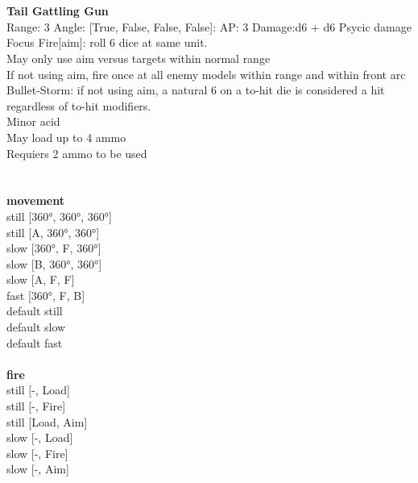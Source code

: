 \ \\

\ \\
{\bf Tail Gattling Gun } \\



Range: 3  Angle: [True, False, False, False]: AP: 3 Damage:d6 + d6 Psycic damage \\
Focus Fire[aim]: roll 6 dice at same unit.\\ 
May only use aim versus targets within normal range\\ 
If not using aim, fire once at all enemy models within range and within front arc\\ 
Bullet-Storm: if not using aim, a natural 6 on a to-hit die is considered a hit regardless of to-hit modifiers.\\ 
Minor acid\\ 
May load up to 4 ammo\\ 
Requiers 2 ammo to be used\\ 




 
\ \\



\ \\ {\bf movement } \\
still [360°, 360°, 360°] \\
still [A, 360°, 360°] \\
slow [360°, F, 360°] \\
slow [B, 360°, 360°] \\
slow [A, F, F] \\
fast [360°, F, B] \\
default still \\
default slow \\
default fast \\
\ \\ {\bf fire } \\
still [-, Load] \\
still [-, Fire] \\
still [Load, Aim] \\
slow [-, Load] \\
slow [-, Fire] \\
slow [-, Aim] \\


